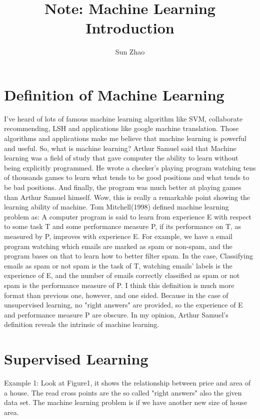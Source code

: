\documentclass{article}
\title{Note: Machine Learning Introduction}
\author{Sun Zhao}
\begin{document}
\maketitle
\newpage

\section{Definition of Machine Learning}
I've heard of lots of famous machine learning algorithm like SVM, collaborate recommending, LSH and applications like google machine translation. Those algorithms and applications make me believe that machine learning is powerful and useful. So, what is machine learning? Arthur Samuel said that Machine learning was a field of study that gave computer the ability to learn without being explicitly programmed. He wrote a checker's playing program watching tens of thousands games to learn what tends to be good positions and what tends to be bad positions. And finally, the program was much better at playing games than Arthur Samuel himself. Wow, this is really a remarkable point showing the learning ability of machine. Tom Mitchell(1998) defined machine learning problem as: A computer program is said to learn from experience E with respect to some task T and some performance measure P, if its performance on T, as measured by P, improves with experience E. For example, we have a email program watching which emails are marked as spam or non-spam, and the program bases on that to learn how to better filter spam. In the case, Classifying emails as spam or not spam is the task of T, watching emails' labels is the experience of E, and the number of emails correctly classified as spam or not spam is the performance measure of P. I think this definition is much more format than previous one, however, and one sided. Because in the case of unsupervised learning, no "right answers" are provided, so the experience of E and performance measure P are obscure. In my opinion, Arthur Samuel's definition reveals the intrinsic of machine learning.
\section{Supervised Learning}
Example 1: Look at Figure1, it shows the relationship between price and area of a house. The read cross points are the so called "right answers" also the given data set. The machine learning problem is if we have another new size of house area.
\end{document}
